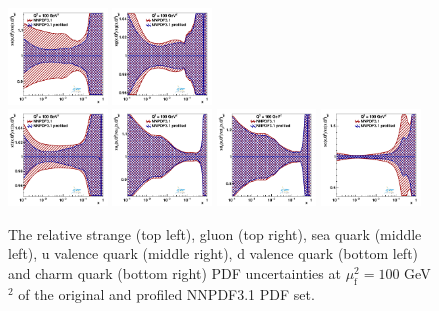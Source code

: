 \documentclass[pdftex,twocolumn,epjc3]{svjour3}          %
\newcommand{\nnpdf} {NNPDF3.1\xspace}
\begin{document}
\begin{figure}
    \centering
    {{\includegraphics[width=0.235\textwidth]{pics/pdf-profile-fonll/q2_100_pdf_s_ratio.pdf}}}
    {{\includegraphics[width=0.235\textwidth]{pics/pdf-profile-fonll/q2_100_pdf_g_ratio.pdf}}}\\
    {{\includegraphics[width=0.235\textwidth]{pics/pdf-profile-fonll/q2_100_pdf_Sea_ratio.pdf}}}
    {{\includegraphics[width=0.235\textwidth]{pics/pdf-profile-fonll/q2_100_pdf_uv_ratio.pdf}}}
    {{\includegraphics[width=0.235\textwidth]{pics/pdf-profile-fonll/q2_100_pdf_dv_ratio.pdf}}}
    {{\includegraphics[width=0.235\textwidth]{pics/pdf-profile-fonll/q2_100_pdf_c_ratio.pdf}}}
    \caption{The relative strange (top left), gluon (top right), sea quark (middle left), u valence quark (middle right), d valence quark (bottom left) and charm quark (bottom right) PDF uncertainties at $\mu_\mathrm{f}^2=100$ GeV$^2$ of the original and profiled \nnpdf PDF set.}
    \label{fig:pdf-nnpdf}
\end{figure}
\end{document}
